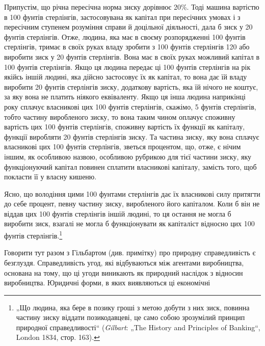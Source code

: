 Припустім, що річна пересічна норма зиску дорівнює 20\%.
Тоді машина вартістю в 100 фунтів стерлінгів, застосовувана
як капітал при пересічних умовах і з пересічним ступенем розуміння
справи й доцільної діяльності, дала б зиск у 20 фунтів
стерлінгів. Отже, людина, яка має в своєму розпорядженні
100 фунтів стерлінгів, тримає в своїх руках владу зробити
з 100 фунтів стерлінгів 120 або виробити зиск у 20 фунтів стерлінгів.
Вона має в своїх руках можливий капітал в 100 фунтів
стерлінгів. Якщо ця людина передає ці 100 фунтів стерлінгів
на рік якійсь іншій людині, яка дійсно застосовує їх як капітал,
то вона дає їй владу виробити 20 фунтів стерлінгів зиску, додаткову
вартість, яка їй нічого не коштує, за яку вона не платить
ніякого еквіваленту. Якщо ця інша людина наприкінці
року сплачує власникові цих 100 фунтів стерлінгів, скажімо,
5 фунтів стерлінгів, тобто частину виробленого зиску, то вона
таким чином оплачує споживну вартість цих 100 фунтів стерлінгів,
споживну вартість їх функції як капіталу, функції виробляти
20 фунтів стерлінгів зиску. Та частина зиску, яку вона
сплачує власникові цих 100 фунтів стерлінгів, зветься процентом,
що, отже, є нічим іншим, як особливою назвою, особливою
рубрикою для тієї частини зиску, яку функціонуючий капітал
повинен сплатити власникові капіталу, замість того, щоб покласти
її у власну кишеню.

Ясно, що володіння цими 100 фунтами стерлінгів дає їх
власникові силу притягти до себе процент, певну частину
зиску, виробленого його капіталом. Коли б він не віддав цих
100 фунтів стерлінгів іншій людині, то ця остання не могла б
виробити зиск, взагалі не могла б функціонувати як капіталіст
відносно цих 100 фунтів стерлінгів.\footnote{„Що людина, яка бере в позику гроші з метою добути з них зиск, повинна
частину зиску віддати позикодавцеві, це само собою зрозумілий принцип
природної справедливості“ (\emph{Gilbart}: „The History and Principles of Banking“,
London 1834, стор. 163).}

Говорити тут разом з Гільбартом (див. примітку) про природну
справедливість є безглуздя. Справедливість угод, які
відбуваються між агентами виробництва, основана на тому, що
ці угоди виникають як природний наслідок з відносин виробництва.
Юридичні форми, в яких виявляються ці економічні
\parbreak{}  %
